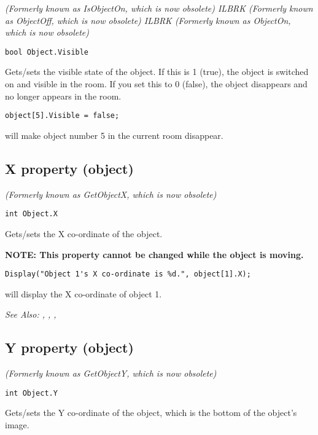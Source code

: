 \it{(Formerly known as IsObjectOn, which is now obsolete)} ILBRK
\it{(Formerly known as ObjectOff, which is now obsolete)} ILBRK
\it{(Formerly known as ObjectOn, which is now obsolete)}

\begin{verbatim}
bool Object.Visible
\end{verbatim}
Gets/sets the visible state of the object. If this is 1 (true), the object is switched on
and visible in the room. If you set this to 0 (false), the object disappears and no longer
appears in the room.

\begin{verbatim}
object[5].Visible = false;
\end{verbatim}
will make object number 5 in the current room disappear.


\subsection{X property (object)}\label{Object.X}%

\it{(Formerly known as GetObjectX, which is now obsolete)}

\begin{verbatim}
int Object.X
\end{verbatim}
Gets/sets the X co-ordinate of the object.

\bf{NOTE:} This property cannot be changed while the object is moving.

\begin{verbatim}
Display("Object 1's X co-ordinate is %d.", object[1].X);
\end{verbatim}
will display the X co-ordinate of object 1.

\it{See Also:} , ,
, 


\subsection{Y property (object)}\label{Object.Y}%

\it{(Formerly known as GetObjectY, which is now obsolete)}

\begin{verbatim}
int Object.Y
\end{verbatim}
Gets/sets the Y co-ordinate of the object, which is the bottom of the object's image.


